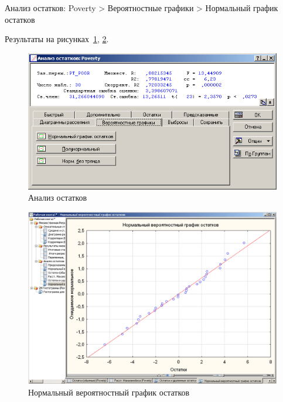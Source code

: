 Анализ остатков: Poverty > Вероятностные графики > Нормальный график остатков

Результаты на рисунках~\ref{fig:example_35}, \ref{fig:example_36}.

\begin{figure}[!h]
  \centering

  \includegraphics[width=16cm]
  {inc/example_35.PNG}

  \caption{Анализ остатков}

  \label{fig:example_35}
\end{figure}

\begin{figure}[!h]
  \centering

  \includegraphics[width=16cm]
  {inc/example_36.PNG}

  \caption{Нормальный вероятностный график остатков}

  \label{fig:example_36}
\end{figure}

